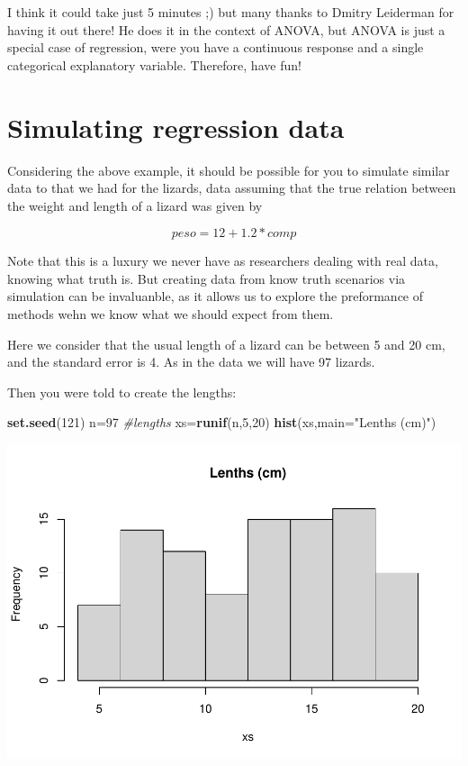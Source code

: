 \documentclass[
]{book}
\newenvironment{Shaded}{\begin{snugshade}}{\end{snugshade}}
\newcommand{\AttributeTok}[1]{\textcolor[rgb]{0.13,0.29,0.53}{#1}}
\newcommand{\CommentTok}[1]{\textcolor[rgb]{0.56,0.35,0.01}{\textit{#1}}}
\newcommand{\DecValTok}[1]{\textcolor[rgb]{0.00,0.00,0.81}{#1}}
\newcommand{\FunctionTok}[1]{\textcolor[rgb]{0.13,0.29,0.53}{\textbf{#1}}}
\newcommand{\NormalTok}[1]{#1}
\newcommand{\OtherTok}[1]{\textcolor[rgb]{0.56,0.35,0.01}{#1}}
\newcommand{\StringTok}[1]{\textcolor[rgb]{0.31,0.60,0.02}{#1}}
\begin{document}
I think it could take just 5 minutes ;) but many thanks to Dmitry Leiderman for having it out there! He does it in the context of ANOVA, but ANOVA is just a special case of regression, were you have a continuous response and a single categorical explanatory variable. Therefore, have fun!

\hypertarget{simulating-regression-data}{%
\section{Simulating regression data}\label{simulating-regression-data}}

Considering the above example, it should be possible for you to simulate similar data to that we had for the lizards, data assuming that the true relation between the weight and length of a lizard was given by

\[ peso = 12 + 1.2 * comp \]

Note that this is a luxury we never have as researchers dealing with real data, knowing what truth is. But creating data from know truth scenarios via simulation can be invaluanble, as it allows us to explore the preformance of methods wehn we know what we should expect from them.

Here we consider that the usual length of a lizard can be between 5 and 20 cm, and the standard error is 4. As in the data we will have 97 lizards.

Then you were told to create the lengths:

\begin{Shaded}
\begin{Highlighting}[]
\FunctionTok{set.seed}\NormalTok{(}\DecValTok{121}\NormalTok{)}
\NormalTok{n}\OtherTok{=}\DecValTok{97}
\CommentTok{\#lengths}
\NormalTok{xs}\OtherTok{=}\FunctionTok{runif}\NormalTok{(n,}\DecValTok{5}\NormalTok{,}\DecValTok{20}\NormalTok{)}
\FunctionTok{hist}\NormalTok{(xs,}\AttributeTok{main=}\StringTok{"Lenths (cm)"}\NormalTok{)}
\end{Highlighting}
\end{Shaded}

\includegraphics{ECOMODbook_files/figure-latex/a6.21-1.pdf}
\end{document}
